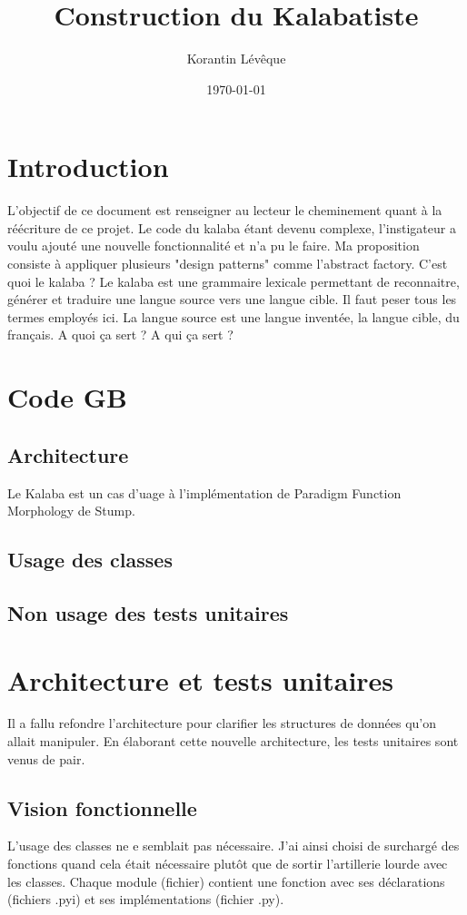 \documentclass[12pt,a4paper,twoside]{article}
\title{\vspace{-3\baselineskip}Construction du Kalabatiste}\label{toto}
\author{Korantin Lévêque}
\date{\today}
\begin{document}
\chead{\ref{Kalabatiste}}


\maketitle
\tableofcontents

\section{Introduction}
L'objectif de ce document est renseigner au lecteur le cheminement quant à la réécriture de ce projet.
Le code du kalaba étant devenu complexe, l'instigateur a voulu ajouté une nouvelle fonctionnalité et n'a pu le faire.
Ma proposition consiste à appliquer plusieurs "design patterns" comme l'abstract factory.
C'est quoi le kalaba ?
Le kalaba est une grammaire lexicale permettant de reconnaitre, générer et traduire une langue source
vers une langue cible. Il faut peser tous les termes employés ici. La langue source est une langue inventée,
la langue cible, du français.
A quoi ça sert ?
A qui ça sert ?
\section{Code GB}
\subsection{Architecture}
Le Kalaba est un cas d'uage à l'implémentation de Paradigm Function Morphology de Stump.
\subsection{Usage des classes}
\subsection{Non usage des tests unitaires}


\section{Architecture et tests unitaires}
Il a fallu refondre l'architecture pour clarifier les structures de données qu'on allait manipuler.
En élaborant cette nouvelle architecture, les tests unitaires sont venus de pair.
\subsection{Vision fonctionnelle}
L'usage des classes ne e semblait pas nécessaire. J'ai ainsi choisi de surchargé des fonctions quand cela était nécessaire
plutôt que de sortir l'artillerie lourde avec les classes. Chaque module (fichier) contient une fonction
avec ses déclarations (fichiers .pyi) et ses implémentations (fichier .py).
\end{document}
